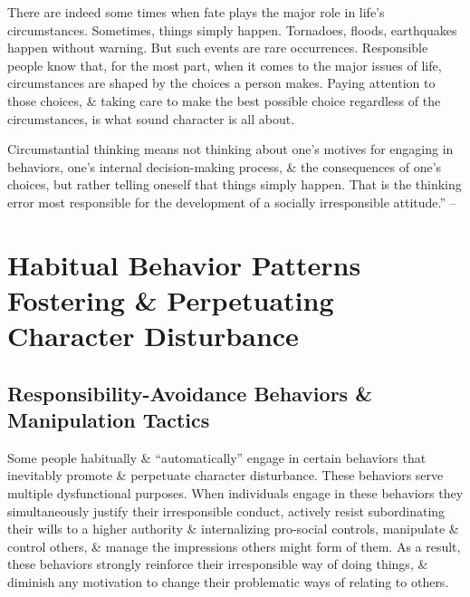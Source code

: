 \documentclass{article}
\numberwithin{equation}{section}
\begin{document}
There are indeed some times when fate plays the major role in life's circumstances. Sometimes, things simply happen. Tornadoes, floods, earthquakes happen without warning. But such events are rare occurrences. Responsible people know that, for the most part, when it comes to the major issues of life, circumstances are shaped by the choices a person makes. Paying attention to those choices, \& taking care to make the best possible choice regardless of the circumstances, is what sound character is all about.

Circumstantial thinking means not thinking about one's motives for engaging in behaviors, one's internal decision-making process, \& the consequences of one's choices, but rather telling oneself that things simply happen. That is the thinking error most responsible for the development of a socially irresponsible attitude.'' -- \cite[pp. 151--166]{Simon2011}


\section{Habitual Behavior Patterns Fostering \& Perpetuating Character Disturbance}

\subsection{Responsibility-Avoidance Behaviors \& Manipulation Tactics}
Some people habitually \& ``automatically'' engage in certain behaviors that inevitably promote \& perpetuate character disturbance. These behaviors serve multiple dysfunctional purposes. When individuals engage in these behaviors they simultaneously justify their irresponsible conduct, actively resist subordinating their wills to a higher authority \& internalizing pro-social controls, manipulate \& control others, \& manage the impressions others might form of them. As a result, these behaviors strongly reinforce their irresponsible way of doing things, \& diminish any motivation to change their problematic ways of relating to others.
\end{document}
